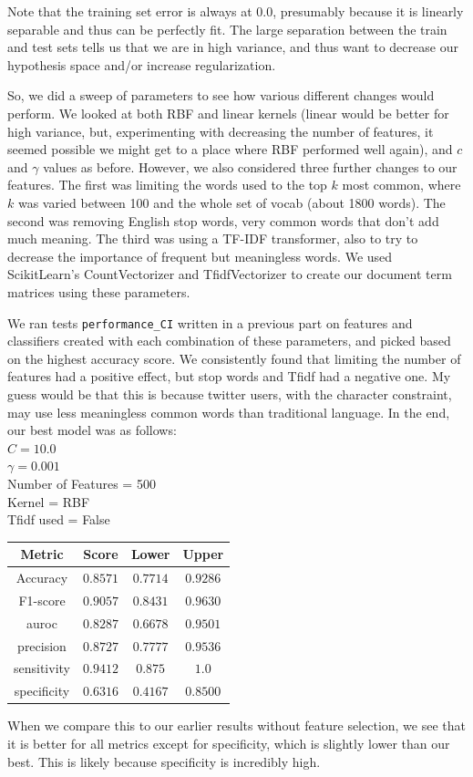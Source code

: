 \documentclass[11pt]{article}
\begin{document}
\begin{enumerate}
Note that the training set error is always at 0.0, presumably because it is linearly separable and thus can be 
perfectly fit. The large separation between the train and test sets tells us that we are in high variance, and 
thus want to decrease our hypothesis space and/or increase regularization.

So, we did a sweep of parameters to see how various different changes would perform. We looked at 
both RBF and linear kernels (linear would be better for high variance, but, experimenting with decreasing the number of features, it seemed possible we might get to a place where RBF performed well again), and $c$
and $\gamma$ values as before. However, we also considered three further changes to our features. The 
first was limiting the words used to the top $k$ most common, where $k$ was varied between 100 and the whole
set of vocab (about 1800 words). The second was removing English stop words, very common words that don't add much meaning. The third was using a TF-IDF transformer, also to try to decrease the importance of frequent but meaningless words. We used ScikitLearn's CountVectorizer and TfidfVectorizer to create our document term matrices using these parameters. 

We ran tests \texttt{performance\_CI} written in a previous part on features and classifiers created with each combination of these parameters, and picked based on the highest accuracy score. We consistently found that limiting the number of features had a positive effect, but stop words and Tfidf had a negative one. My guess would be that this is because twitter users, with the character constraint, may use less meaningless common words than traditional language. In the end, our best model was as follows:
\\$C=10.0$
\\$\gamma = 0.001$
\\Number of Features = 500
\\Kernel = RBF
\\ Tfidf used = False

\begin{tabular}{| c | c | c | c |}
\hline
Metric & Score & Lower & Upper \\
\hline
Accuracy & $0.8571$ & $0.7714$ & $0.9286$ \\
F1-score & $0.9057$ & $0.8431$ & $0.9630$ \\
auroc & $0.8287$ & $0.6678$ & $0.9501$ \\
precision & $0.8727$ & $0.7777$ & $0.9536$ \\
sensitivity & $0.9412$ & $0.875$ & $1.0$ \\
specificity & $0.6316$ & $0.4167$ & $0.8500$ \\
\hline
\end{tabular}

When we compare this to our earlier results without feature selection, we see that it is better for all metrics
except for specificity, which is slightly lower than our best. This is likely because specificity is incredibly high. 

\end{enumerate}
\end{document}
